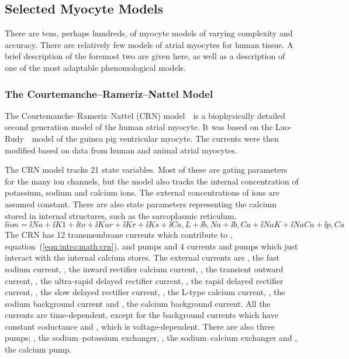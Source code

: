 \subsection{Selected Myocyte Models}

There are tens, perhaps hundreds, of myocyte models of varying complexity and
accuracy.
There are relatively few models of atrial myocytes for human tissue.
A brief description of the foremost two are given here, as well as a description
of one of the most adaptable phenomological models.

\subsubsection{The Courtemanche--Rameriz--Nattel Model}

The Courtemanche--Rameriz--Nattel (CRN) model~\cite{CRN98}\ is a biophysically
detailed second generation model of the human atrial myocyte.
It was based on the Luo-Rudy~\cite{Luo1994}\ model of the guinea pig ventricular
myocyte.
The currents were then modified based on data from human and animal atrial
myocytes.

The CRN model tracks 21 state variables.
Most of these are gating parameters for the many ion channels, but the model
also tracks the internal concentration of potassium, sodium and calcium ions.
The external concentrations of ions are assumed constant.
There are also state parameters representing the calcium stored in internal
structures, such as the sarcoplasmic reticulum.
\begin{equation}
\label{eqn:intro:math:crn}
\ii{ion} = \ii{Na} + \ii{K1} + \ii{to} + \ii{Kur} + \ii{Kr} + \ii{Ks} +
\ii{Ca,L} + \ii{b,Na} + \ii{b,Ca} + \ii{NaK} + \ii{NaCa} + \ii{p,Ca}
\end{equation}
The CRN has 12 transmembrane currents which contribute to ,
equation~(\ref{eqn:intro:math:crn}), and pumps and 4 currents and
pumps which just interact with the internal calcium stores.
The external currents are , the fast sodium current, , the inward
rectifier calcium current, , the transient outward current, , the
ultra-rapid delayed rectifier current, , the rapid delayed rectifier
current, , the slow delayed rectifier current, , the L-type
calcium current, , the sodium background current and , the
calcium background current.
All the currents are time-dependent, except for the background currents which
have constant coductance and , which is voltage-dependent.
There are also three pumps; , the sodium--potassium exchanger,
, the sodium--calcium exchanger and , the calcium pump.

